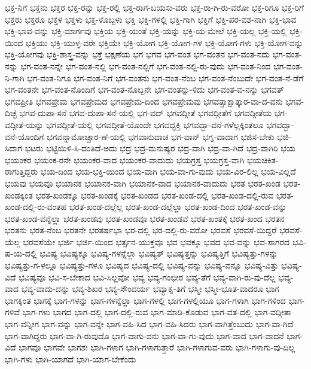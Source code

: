 {ಭಕ್ತ-ನಿಗೆ
ಭಕ್ತನು
ಭಕ್ತರ
ಭಕ್ತ-ರನ್ನು
ಭಕ್ತ-ರಲ್ಲಿ
ಭಕ್ತ-ರಾಗ-ಬಯಸು-ವರು
ಭಕ್ತ-ರಾ-ಗಿ-ರು-ವರೋ
ಭಕ್ತ-ರಿಗೂ
ಭಕ್ತ-ರಿಗೆ
ಭಕ್ತರು
ಭಕ್ತರೂ
ಭಕ್ತಳ
ಭಕ್ತಳು
ಭಕ್ತ-ಳೊಬ್ಬಳು
ಭಕ್ತಿ
ಭಕ್ತಿ-ಗಳಲ್ಲಿ
ಭಕ್ತಿ-ಗಾಗಿ
ಭಕ್ತಿಗೆ
ಭಕ್ತಿ-ಪರ-ವಶ-ನಾಗಿ
ಭಕ್ತಿ-ಭಾವ
ಭಕ್ತಿ-ಭಾವ-ವನ್ನು
ಭಕ್ತಿ-ಮಾರ್ಗವು
ಭಕ್ತಿಯ
ಭಕ್ತಿ-ಯಂತೆ
ಭಕ್ತಿ-ಯನ್ನು
ಭಕ್ತಿ-ಯ-ಮೇಲೆ
ಭಕ್ತಿ-ಯಲ್ಲ
ಭಕ್ತಿ-ಯಲ್ಲಿ
ಭಕ್ತಿ-ಯಿಂದ
ಭಕ್ತಿಯು
ಭಕ್ತಿ-ಯುಳ್ಳ-ವರೇ
ಭಕ್ತಿಯೇ
ಭಕ್ತಿ-ಯೋಗ
ಭಕ್ತಿ-ಯೋಗ-ಗಳ
ಭಕ್ತಿ-ಯೋಗ-ಗಳು
ಭಕ್ತಿ-ಯೋಗ-ವನ್ನು
ಭಕ್ತಿ-ಯೋಗವು
ಭಕ್ತಿ-ಶಾಸ್ತ್ರ-ವನ್ನು
ಭಕ್ತೆ
ಭಕ್ಷಣೆಯ
ಭಗ
ಭಗವ
ಭಗ-ವಂತ
ಭಗ-ವಂತನ
ಭಗ-ವಂತ-ನದು
ಭಗ-ವಂತ-ನನ್ನು
ಭಗ-ವಂತ-ನನ್ನೇ
ಭಗ-ವಂತ-ನಲ್ಲಿ
ಭಗ-ವಂತ-ನಲ್ಲಿಗೆ
ಭಗ-ವಂತ-ನಲ್ಲಿ-ರು-ವುದು
ಭಗ-ವಂತ-ನಿಂದ
ಭಗ-ವಂತ-ನಿ-ಗಾಗಿ
ಭಗ-ವಂತ-ನಿಗೂ
ಭಗ-ವಂತ-ನಿಗೆ
ಭಗ-ವಂತನು
ಭಗ-ವಂತ-ನೆಂಬ
ಭಗ-ವಂತ-ನೆಂಬುದೇ
ಭಗ-ವಂತ-ನೆ-ಡೆಗೆ
ಭಗ-ವಂತನೇ
ಭಗ-ವಂತ-ನೊಂದಿಗೆ
ಭಗ-ವಂತ-ನೊಬ್ಬನೇ
ಭಗ-ವಂತನ್ನು-ಳಿದು
ಭಗ-ವಂತ-ವ-ನನ್ನು
ಭಗವತ್
ಭಗವಪ್ರೀತಿ
ಭಗವಪ್ರೇಮ
ಭಗವಪ್ರೇಮದ
ಭಗವಪ್ರೇಮ-ದಿಂದ
ಭಗವಪ್ರೇಮವು
ಭಗವತ್ಸಾಕ್ಷಾತ್ಕಾರ-ವಾ-ದ-ವನು
ಭಗವ-ದಿಚ್ಛೆ
ಭಗವ-ದುಪಾ-ಸನೆ
ಭಗವ-ದುಪಾ-ಸನೆ-ಯಲ್ಲಿ
ಭಗ-ವದ್
ಭಗವದ್ಗೀತೆ
ಭಗವದ್ಗೀತೆಗೆ
ಭಗವದ್ಗೀತೆಯ
ಭಗ-ವದ್ಗೀತೆ-ಯನ್ನು
ಭಗವದ್ಗೀತೆ-ಯಲ್ಲಿ
ಭಗವದ್ಗೀತೆ-ಯೊಂದೇ
ಭಗವದ್ಭಕ್ತಿ
ಭಗವದ್ಭಾ-ವನೆ-ಗಳೆಲ್ಲಕ್ಕಿಂತಲೂ
ಭಗವದ್ಭಾ-ವನೆ-ಯೊಂದಿಗೆ
ಭಗವನ್ನಾಮೋಚ್ಚಾರ-ಣೆ-ಯಲ್ಲಿ
ಭಗವಾನುವಾಚ
ಭಗ-ವಾನ್
ಭಗ್ನ-ವಾದಾಗ
ಭಜಿಸ-ಬೇಕು
ಭಜಿ-ಸಿದಾಗ
ಭಟರು
ಭಟ್ಟಿಯಿಳಿ-ಸಿ-ದಂತಿದೆ-ಅದು
ಭದ್ರ
ಭದ್ರ-ಮನುಷ್ಯರ
ಭದ್ರ-ವಾಗಿ
ಭದ್ರ-ವಾ-ಗಿದೆ
ಭದ್ರ-ವಾಗಿರಿ
ಭಯ
ಭಯಂಕರ
ಭಯಂಕ-ರನೇ
ಭಯಂಕರ-ವಾದ
ಭಯಂಕರ-ವಾದುದು
ಭಯಗ್ರಸ್ತ
ಭಯಗ್ರಸ್ತ-ವಾಗಿ
ಭಯಚಿಕಿತ-ರಾಗುತ್ತಿದ್ದರು
ಭಯ-ದಿಂದ
ಭಯ-ಭಕ್ತಿ-ಯಿಂದ
ಭಯ-ವಾಗಿ
ಭಯ-ವಾ-ಗು-ವುದು
ಭಯ-ವಿರ-ಲಿಲ್ಲ
ಭಯ-ವಿಲ್ಲದೆ
ಭಯವು
ಭಯವೂ
ಭಯಾನಕ
ಭಯಾನಕ-ವಾಗಿ
ಭಯಾನಕ-ವಾದ
ಭಯಾನಕ-ವಾದುದು
ಭರತ
ಭರತ-ಖಂಡ
ಭರತ-ಖಂಡಕ್ಕಿಂತ
ಭರತ-ಖಂಡಕ್ಕೂ
ಭರತ-ಖಂಡಕ್ಕೆ
ಭರತ-ಖಂಡದ
ಭರತ-ಖಂಡ-ದಲ್ಲಿ
ಭರತ-ಖಂಡ-ದಲ್ಲಿ-ರುವ
ಭರತ-ಖಂಡ-ದಲ್ಲಿ-ರು-ವಂತಹ
ಭರತ-ಖಂಡ-ದಲ್ಲೆಲ್ಲ
ಭರತ-ಖಂಡ-ದಲ್ಲೆಲ್ಲಾ
ಭರತ-ಖಂಡ-ದಿಂದ
ಭರತ-ಖಂಡ-ವನ್ನು
ಭರತ-ಖಂಡ-ವನ್ನೆಲ್ಲಾ
ಭರತ-ಖಂಡವು
ಭರತ-ಖಂಡವೂ
ಭರತ-ಖಂಡವೆ
ಭರತ-ಖಂತಕ್ಕೆ
ಭರತ-ಖಂದ
ಭರತನ
ಭರತನು
ಭರತ-ನೆಂಬ
ಭರತನೇ
ಭರತರ್ಷಭಾ
ಭರ-ದಲ್ಲಿ
ಭರ-ದಲ್ಲಿ-ರು-ವರೋ
ಭರವಸೆ
ಭರವಸೆ-ಯಿದ್ದರೆ
ಭರವಸೆ-ಯೆಲ್ಲ
ಭರವಸೆಯೇ
ಭರ್ಜಿ
ಭರ್ಜಿ-ಯಿಂದ
ಭರ್ತ್ಸನ-ಯುಕ್ತವೂ
ಭವ
ಭವಕ್ಕೂ
ಭವದ
ಭವ-ವನ್ನು
ಭವ-ಸಾಗರದ
ಭವಿ-ಷ-ಯ-ದಲ್ಲಿ
ಭವಿಷ್ಯ
ಭವಿಷ್ಯಕ್ಕೂ
ಭವಿಷ್ಯ-ಗಳನ್ನೆಲ್ಲಾ
ಭವಿಷ್ಯತ್
ಭವಿಷ್ಯತ್ತನ್ನು
ಭವಿಷ್ಯತ್ತಿಗೆ
ಭವಿಷ್ಯತ್ತು-ಗಳನ್ನು
ಭವಿಷ್ಯತ್ತು-ಗ-ಳಲ್ಲೂ
ಭವಿಷ್ಯತ್ತು-ಗಳೂ
ಭವಿಷ್ಯದ
ಭವಿಷ್ಯ-ದಲ್ಲಿ
ಭವಿಷ್ಯ-ವನ್ನು
ಭವಿಷ್ಯ-ವನ್ನೂ
ಭವಿಷ್ಯ-ವಿತ್ತು
ಭವಿಷ್ಯ-ವಿದೆ
ಭವಿಷ್ಯವೂ
ಭವಿ-ಸ-ಬೇಕಾದ
ಭವಿ-ಸಿಲ್ಲವೋ
ಭವ್ಯ
ಭವ್ಯ-ಗಂಭೀರ
ಭವ್ಯ-ತೆಗೆ
ಭವ್ಯ-ವಾಗಿ-ರು-ವು-ದೆಲ್ಲ
ಭವ್ಯ-ವಾದ
ಭವ್ಯ-ವಾದು-ದನ್ನು
ಭವ್ಯ-ಶಿಖರ
ಭವ್ಯ-ಸೌಂದರ್ಯ
ಭವ್ಯಾಕೃ-ತಿಗೆ
ಭಸ್ಮೀ
ಭಸ್ಮೀ-ಭೂತ-ವಾದರೂ
ಭಾಗ
ಭಾಗಕ್ಕಿಂತ
ಭಾಗಕ್ಕೆ
ಭಾಗ-ಗಳನ್ನು
ಭಾಗ-ಗಳನ್ನೆಲ್ಲಾ
ಭಾಗ-ಗಳಲ್ಲಿ
ಭಾಗ-ಗಳಲ್ಲಿಯೂ
ಭಾಗ-ಗಳಾಗಿ
ಭಾಗ-ಗಳಿಂದ
ಭಾಗ-ಗಳಿವೆ
ಭಾಗ-ಗಳು
ಭಾಗದ
ಭಾಗ-ದಲ್ಲಿ
ಭಾಗ-ದಲ್ಲಿ-ರುವ
ಭಾಗ-ಮಾಡಿ-ಕೊಡುವ
ಭಾಗ-ವತ-ದಲ್ಲಿ
ಭಾಗ-ವದ್ಗೀತಾ
ಭಾಗ-ವನ್ನೀಗ
ಭಾಗ-ವನ್ನು
ಭಾಗ-ವನ್ನೇ
ಭಾಗ-ವಹಿ-ಸಿದ
ಭಾಗ-ವಹಿ-ಸಿದರು
ಭಾಗ-ವಾಗಿತ್ತೆಂಬುದು
ಭಾಗ-ವಾ-ಗಿದೆ
ಭಾಗ-ವಾಗಿದ್ದರು
ಭಾಗ-ವಾ-ಗಿ-ರುವುದೊ
ಭಾಗ-ವಾಗು-ವನು
ಭಾಗ-ವಾ-ಗು-ವುದು
ಭಾಗ-ವಾದ
ಭಾಗ-ವಾದನೆ
ಭಾಗ-ವಿದೆ
ಭಾಗವೂ
ಭಾಗವೇ
ಭಾಗಶಃ
ಭಾಗಿ-ಗಳಾಗ
ಭಾಗಿ-ಗಳಾಗುತ್ತಾರೆ
ಭಾಗಿ-ಗಳಾಗುವ-ವರು
ಭಾಗಿ-ಗಳಾಗು-ವು-ದಿಲ್ಲ
ಭಾಗಿ-ಗಳು
ಭಾಗಿ-ಯಾಗದೆ
ಭಾಗಿ-ಯಾಗ-ಬೇಕೆಂದು
}
